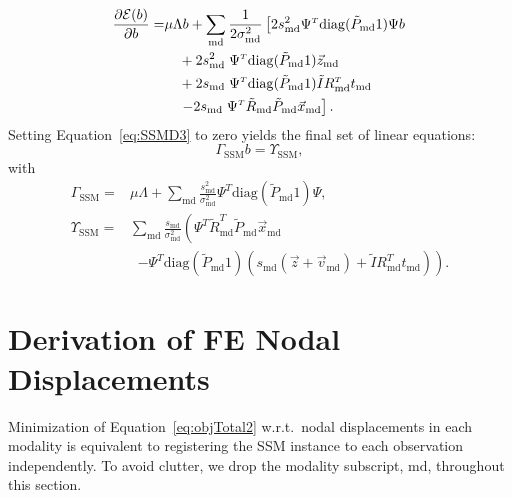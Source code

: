 \documentclass[journal]{IEEEtran}
\newcommand{\di}[2]{\frac{\partial#1}{\partial#2}}
\newcommand{\trans}[1]{#1^{\scriptscriptstyle T}}
\newcommand{\diag}{\mathrm{diag}}
\newcommand{\wrt}{w.r.t.}
\begin{document}
\begin{align}\label{eq:SSMD3}
    \di{\mathcal{E}(b)}{b} = & \mu\Lambda{b}+\sum_\mathrm{md}\dfrac{1}{2\sigma^2_\mathrm{md}}\left[2s^2_\mathrm{md}\trans{\Psi}\diag(\tilde{P}_\mathrm{md}1){\Psi}b\right.\notag\\
  & \quad +2s^2_\mathrm{md}\;\trans{\Psi}\diag(\tilde{P}_\mathrm{md}1)\vec{z}_\mathrm{md}\notag\\
  & \quad +2s_\mathrm{md}\;\trans{\Psi}\diag(\tilde{P}_\mathrm{md}1)\tilde{I}\trans{R}_\mathrm{md}t_\mathrm{md}\notag\\
  & \quad \left.-2s_\mathrm{md}\;\trans{\Psi}\tilde{R}_\mathrm{md}\tilde{P}_\mathrm{md}\vec{x}_\mathrm{md}\right].
\end{align}
Setting Equation~\eqref{eq:SSMD3} to zero yields the final set of linear equations:
\begin{equation*}
\Gamma_{\mathrm{SSM}}b = \Upsilon_\mathrm{SSM},
\end{equation*}
with
\begin{align*}
\Gamma_{\mathrm{SSM}} = & \mu\Lambda + \sum_\mathrm{md}\frac{s^2_\mathrm{md}}{\sigma^2_\mathrm{md}}\trans{\Psi}\diag(\tilde{P}_\mathrm{md}1)\Psi,\\
 \Upsilon_{\mathrm{SSM}} = & \sum_{\mathrm{md}}\frac{s_\mathrm{md}}{\sigma^2_\mathrm{md}}\left(\trans{\Psi}\trans{\tilde{R}}_\mathrm{md}\tilde{P}_\mathrm{md}\vec{x}_\mathrm{md}\right.\nonumber\\
 & \;\; \left.-\trans{\Psi}\diag(\tilde{P}_\mathrm{md}1)\!\!\left(s_\mathrm{md}(\vec{z}+\vec{v}_\mathrm{md})+\tilde{I}\trans{R}_\mathrm{md}t_\mathrm{md}\right)\right)\nonumber.
\end{align*}

\section{Derivation of FE Nodal Displacements}\label{sec:app:fem}
Minimization of Equation~\eqref{eq:objTotal2} \wrt\ nodal displacements in each modality is equivalent to registering the SSM instance to each observation independently. To avoid clutter, we drop the modality subscript, $\mathrm{md}$, throughout this section.
\end{document}
